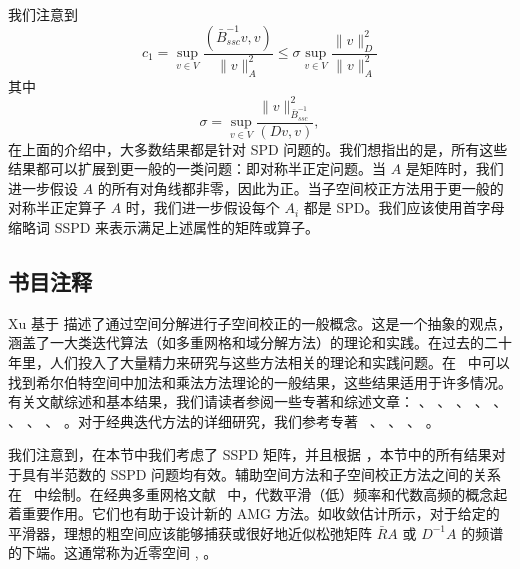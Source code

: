 \documentclass[12pt]{acta_2011xz}
\begin{document}
我们注意到
   $$
c_1=
\sup_{v\in V}\frac{(\bar B_{ssc}^{-1}v, v)}{\|v\|_A^2}
\le \sigma \sup_{v\in V}\frac{\|v\|_D^2}{\|v\|_A^2}
$$    其中
   \begin{equation}
  \label{sigma}
    \sigma = \sup_{v\in V} \frac{\|v\|_{\bar{B}_{ssc}^{-1}}^2}{(D v,v)},  
\end{equation}    在上面的介绍中，大多数结果都是针对 SPD 问题的。我们想指出的是，所有这些结果都可以扩展到更一般的一类问题：即对称半正定问题。当    $A$    是矩阵时，我们进一步假设    $A$    的所有对角线都非零，因此为正。当子空间校正方法用于更一般的对称半正定算子    $A$    时，我们进一步假设每个    $A_i$    都是 SPD。我们应该使用首字母缩略词 SSPD 来表示满足上述属性的矩阵或算子。  

   \subsection{书目注释  }    Xu    \cite{1992XuJ-aa}    基于
   \cite{1991BrambleJ_PasciakJ_WangJ_XuJ-ac,1991BrambleJ_PasciakJ_WangJ_XuJ-aa}    描述了通过空间分解进行子空间校正的一般概念。这是一个抽象的观点，涵盖了一大类迭代算法（如多重网格和域分解方法）的理论和实践。在过去的二十年里，人们投入了大量精力来研究与这些方法相关的理论和实践问题。在~    \cite{Xu.J;Zikatanov.L.2002a}    中可以找到希尔伯特空间中加法和乘法方法理论的一般结果，这些结果适用于许多情况。有关文献综述和基本结果，我们请读者参阅一些专著和综述文章：   \cite{1985HackbuschW-aa}   、   \cite{1993BrambleJ-aa}   、
   \cite{2008VassilevskiP-aa}   、   \cite{1989XuJ-aa,1997XuJ-aa}   、
   \cite{xu1998some}   、   \cite{1993YserentantH-aa}   、
   \cite{2005ToselliA_WidlundO-aa}   、   \cite{1995GriebelM_OswaldP-aa}   、
   \cite{1996SmithB_BjorstadP_GroppW-aa}   。对于经典迭代方法的详细研究，我们参考专著~   \cite{1971YoungD-aa}   、   \cite{1994HackbuschW-aa}   、
   \cite{2000VargaR-aa}   、   \cite{2003SaadY-aa}   。  

我们注意到，在本节中我们考虑了 SSPD 矩阵，并且根据
   \cite{2008LeeY_WuJ_XuJ_ZikatanovL-aa,2007LeeY_WuJ_XuJ_ZikatanovL-aa,2014Ayuso-de-DiosB_BrezziF_MariniL_XuJ_ZikatanovL-aa}    ，本节中的所有结果对于具有半范数的 SSPD 问题均有效。辅助空间方法和子空间校正方法之间的关系在~    \cite{2011ChenL-aa}    中绘制。在经典多重网格文献~    \cite{1stAMG,Brandt.A;McCormick.S;Ruge.J.1985a,Ruge.J;Stuben.K.1987a,Trottenberg.U;Oosterlee.C;Schuller.A.2001a}    中，代数平滑（低）频率和代数高频的概念起着重要作用。它们也有助于设计新的 AMG 方法。如收敛估计所示，对于给定的平滑器，理想的粗空间应该能够捕获或很好地近似松弛矩阵    $\bar R A$    或    $D^{-1}A$    的频谱的下端。这通常称为近零空间 
   \cite{2015TreisterE_YavnehI-aa,2011LaiJ_OlsonL-aa,2009XuJ-aa}    ,
   \cite{2006BrezinaM_FalgoutR_MacLachlanS_ManteuffelT_McCormickS_RugeJ-aa}    。  
\end{document}
